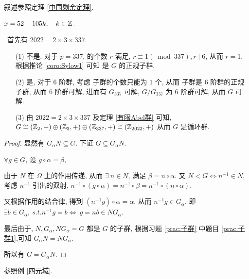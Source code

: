 \problem[题目 5]

\begin{solution}
	叙述参照定理 \ref{中国剩余定理}.

	$x=52+105k,\quad k\in \mathbb Z$.
\end{solution}

\problem[题目 6]

\begin{solution}\
	首先有 $2022=2\times 3\times 337$.
	\begin{itemize}
		\item[(1)]不是, 对于 $p=337$, \Sy[337] 的个数 $r$ 满足, $r\equiv 1(\bmod 337),r\mid 6$, 从而 $r=1$. 根据推论 \ref{coro:Sylow1} 可知 \Sy[337] 是 $G$ 的正规子群.
		\item[(2)]是, 对于 $6$ 阶群, 考虑 \Sy[3] 子群的个数只能为 $1$ 个, 从而 \Sy[3] 子群是 $6$ 阶群的正规子群, 从而 $6$ 阶群可解, 进而有 $G_{337}$ 可解, $G/G_{337}$ 为 $6$ 阶群可解, 从而 $G$ 可解.
		\item[(3)] 由 $2022=2\times 3\times 337$ 及定理 \ref{有限Abel群} 可知, $G\cong (\mathbb Z_2,+)\oplus(\mathbb Z_3,+)\oplus(\mathbb Z_{337},+)\cong(\mathbb Z_{2022},+)$ 从而 $G$ 是循环群.
	\end{itemize}

\end{solution}


\problem[题目 7]

\begin{proof}
	显然有 $G_\alpha N\subseteq G$. 下证 $G\subseteq G_\alpha N$.

	$\forall g\in G$, 设 $g\circ \alpha = \beta$,

	由于 $N$ 在 $\Omega$ 上的作用传递, 从而 $\exists\ n\in N$, 满足 $\beta=n\circ \alpha$. 又 $N<G\Leftrightarrow n^{-1}\in N$, 考虑 $n^{-1}$ 引出的双射, $n^{-1}\circ(g\circ \alpha)=n^{-1}\circ \beta=n^{-1}\circ(n\circ \alpha)$.

	又根据作用的结合律, 得到 $(n^{-1}g)\circ \alpha=\alpha$, 从而 $n^{-1}g\in G_\alpha$, 即 $\exists b\in G_\alpha,\ s.t. n^{-1}g=b\Leftrightarrow\ g=nb\in  NG_\alpha$.

	最后由于, $N,G_\alpha,NG_\alpha=G$ 都是 $G$ 的子群, 根据习题 \ref{prac:子群} 中题目 \ref{prac:子群1},可知 $G_\alpha N=N G_\alpha$.

	所以有 $G=G_\alpha N$.

\end{proof}

\problem[题目 8]

\begin{solution}
	参照例 \ref{四元域}.
\end{solution}

